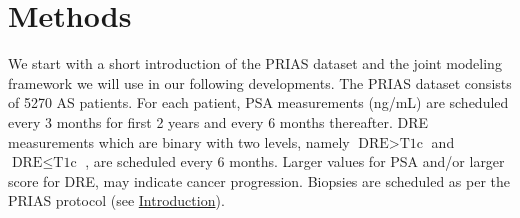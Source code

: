 
\section{Methods}
\label{sec:methods}
We start with a short introduction of the PRIAS dataset and the joint modeling framework we will use in our following developments. The PRIAS dataset consists of 5270 AS patients. For each patient, PSA measurements (ng/mL) are scheduled every 3 months for first 2 years and every 6 months thereafter. DRE measurements which are binary with two levels, namely $\mbox{DRE} > \mbox{T1c}$ and $\mbox{DRE} \leq \mbox{T1c}$ \cite{schroder1992tnm}, are scheduled every 6 months. Larger values for PSA and/or larger score for DRE, may indicate cancer progression. Biopsies are scheduled as per the PRIAS protocol (see \hyperref[sec:introduction]{Introduction}). 

